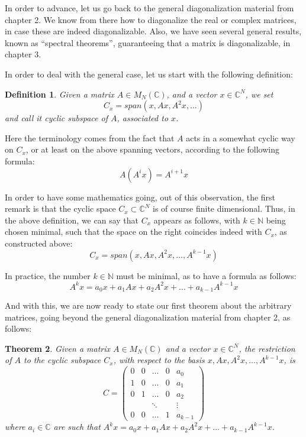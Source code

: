 \documentclass[12pt]{amsbook}
\newtheorem{theorem}{Theorem}[chapter]
\newtheorem{definition}[theorem]{Definition}
\begin{document}
In order to advance, let us go back to the general diagonalization material from chapter 2. We know from there how to diagonalize the real or complex matrices, in case these are indeed diagonalizable. Also, we have seen several general results, known as ``spectral theorems'', guaranteeing that a matrix is diagonalizable, in chapter 3.

\bigskip

In order to deal with the general case, let us start with the following definition:

\begin{definition}
Given a matrix $A\in M_N(\mathbb C)$, and a vector $x\in\mathbb C^N$, we set
$$C_x=span(x,Ax,A^2x,\ldots)$$
and call it cyclic subspace of $A$, associated to $x$.
\end{definition}

Here the terminology comes from the fact that $A$ acts in a somewhat cyclic way on $C_x$, or at least on the above spanning vectors, according to the following formula:
$$A(A^ix)=A^{i+1}x$$

In order to have some mathematics going, out of this observation, the first remark is that the cyclic space $C_x\subset\mathbb C^N$ is of course finite dimensional. Thus, in the above definition, we can say that $C_x$ appears as follows, with $k\in\mathbb N$ being chosen minimal, such that the space on the right coincides indeed with $C_x$, as constructed above:
$$C_x=span(x,Ax,A^2x,\ldots,A^{k-1}x)$$

In practice, the number $k\in\mathbb N$ must be minimal, as to have a formula as follows:
$$A^kx=a_0x+a_1Ax+a_2A^2x+\ldots+a_{k-1}A^{k-1}x$$

And with this, we are now ready to state our first theorem about the arbitrary matrices, going beyond the general diagonalization material from chapter 2, as follows:

\begin{theorem}
Given a matrix $A\in M_N(\mathbb C)$ and a vector $x\in\mathbb C^N$, the restriction of $A$ to the cyclic subspace $C_x$, with respect to the basis $x,Ax,A^2x,\ldots,A^{k-1}x$, is
$$C=\begin{pmatrix}
0&0&\ldots&0&a_0\\
1&0&\ldots&0&a_1\\
0&1&\ldots&0&a_2\\
&&\ddots&&\vdots\\
0&0&\ldots&1&a_{k-1}
\end{pmatrix}$$
where $a_i\in\mathbb C$ are such that $A^kx=a_0x+a_1Ax+a_2A^2x+\ldots+a_{k-1}A^{k-1}x$.
\end{theorem}
\end{document}
